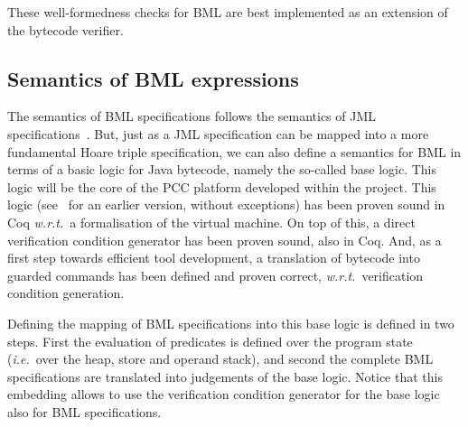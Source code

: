 These well-formedness checks for BML are best implemented as an
extension of the bytecode verifier.
 



\subsection{Semantics of BML expressions}

The semantics of BML specifications follows the semantics of JML
specifications~\cite{JMLReferenceManual05}. But, just as a JML
specification can be mapped into a more fundamental Hoare triple
specification, we can also define a semantics for BML in terms of a
basic logic for Java bytecode, namely the so-called
\mobius base logic. This logic will be the core of the PCC platform
developed within the project. This logic (see~\cite{BeringerH06} for
an earlier version, without exceptions) has been proven sound in Coq
\emph{w.r.t.}\ a formalisation of the virtual machine. On top of this,
a direct verification condition generator has been proven sound, also
in Coq. And, as a first step towards efficient tool development, a
translation of bytecode into guarded commands has been defined and
proven correct, \emph{w.r.t.}\ verification condition generation.

Defining the mapping of BML specifications into this \mobius base
logic is defined in two steps. First the evaluation of predicates is
defined over the program state (\emph{i.e.}\ over the heap, store and
operand stack), and second the complete BML specifications are
translated into judgements of the \mobius base logic. Notice that this
embedding allows to use the verification condition generator for the
\mobius base logic also for BML specifications.

